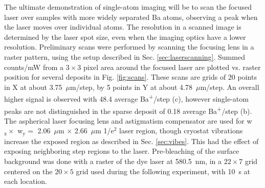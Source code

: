 The ultimate demonstration of single-atom imaging will be to scan the focused laser over samples with more widely separated Ba atoms, observing a peak when the laser moves over individual atoms.  The resolution in a scanned image is determined by the laser spot size, even when the imaging optics have a lower resolution.  Preliminary scans were performed by scanning the focusing lens in a raster pattern, using the setup described in Sec. \ref{sec:laserscanning}.  Summed counts/mW from a $3 \times 3$ pixel area around the focused laser are plotted vs. raster position for several deposits in Fig. \ref{fig:scans}.  These scans are grids of 20 points in X at about 3.75~$\mu$m/step, by 5 points in Y at about 4.78~$\mu$m/step.  An overall higher signal is observed with 48.4 average Ba\textsuperscript{+}/step (c), however single-atom peaks are not distinguished in the sparse deposit of 0.18 average Ba\textsuperscript{+}/step (b).  The aspherical laser focusing lens and astigmatism compensator are used for w$_{\text{x}} \times$ w$_{\text{y}} =$ 2.06~$\mu$m $\times$ 2.66~$\mu$m 1/e$^{2}$ laser region, though cryostat vibrations increase the exposed region as described in Sec. \ref{sec:vibes}.  This had the effect of exposing neighboring step regions to the laser.  Pre-bleaching of the surface background was done with a raster of the dye laser at 580.5~nm, in a $22 \times 7$ grid centered on the $20 \times 5$ grid used during the following experiment, with 10~s at each location.

